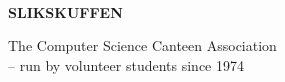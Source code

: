 \documentclass{article}
\begin{document}
~

\vspace{-0.2cm}

\fontsize{20}{20}\selectfont

\textbf{SLIKSKUFFEN}

\vspace{-0.1cm}

\normalsize

\begin{flushright}
The Computer Science Canteen Association~~~~~~~~~~~~~~~~~~~~~~~~\\
-- run by volunteer students since 1974~~~~~~~~~~~~~~~~~~~~~~~~
\end{flushright}
\end{document}
